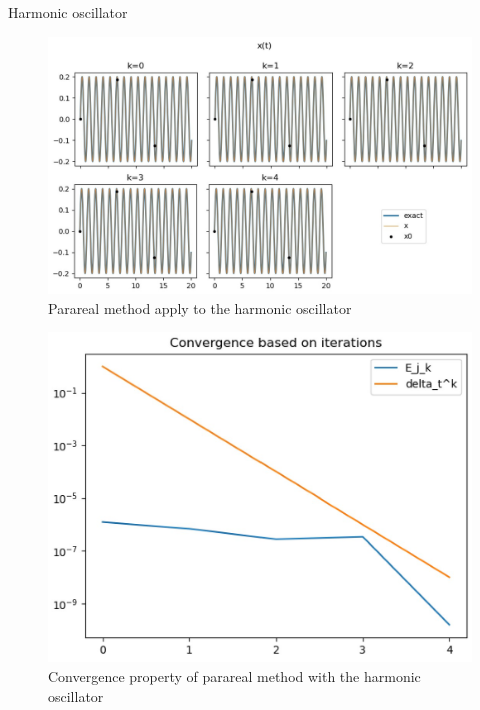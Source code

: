 \begin{frame}[allowframebreaks]{Harmonic oscillator}
	\begin{minipage}{0.6\linewidth}
		\begin{figure}
			\centering
			\includegraphics[width=\linewidth]{"images/parareal/osci_1.jpg"}
			\caption{Parareal method apply to the harmonic oscillator}
		\end{figure}
	\end{minipage} \;
	\begin{minipage}{0.38\linewidth}
		\begin{figure}
			\centering
			\includegraphics[width=\linewidth]{"images/parareal/osci_cvg_1.jpg"}
			\caption{Convergence property of parareal method with the harmonic oscillator}
		\end{figure}
	\end{minipage}
	
\end{frame}


